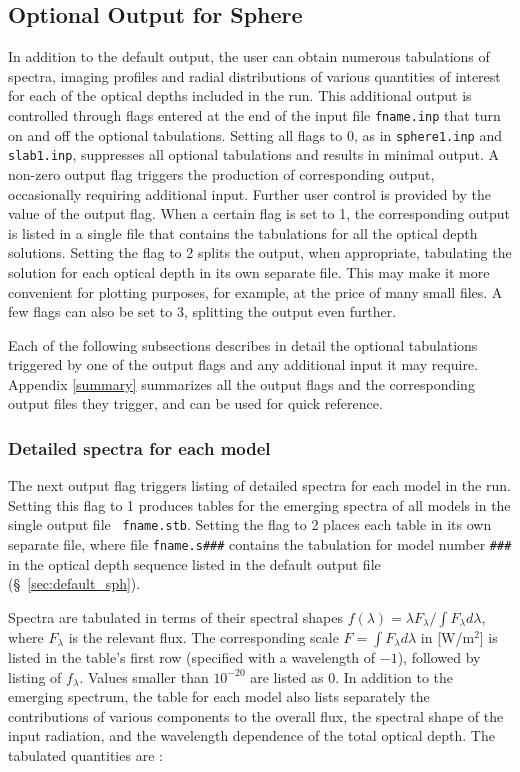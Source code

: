 \documentclass[11pt]{article}
\def\E#1{\hbox{$10^{#1}$}}
\begin{document}
\subsection{Optional Output for Sphere}
\label{sec:optional_sph}

In addition to the default output, the user can obtain numerous
tabulations of spectra, imaging profiles and radial distributions of
various quantities of interest for each of the optical depths included
in the run. This additional output is controlled through flags entered
at the end of the input file {\tt fname.inp} that turn on and off the
optional tabulations.  Setting all flags to 0, as in {\tt sphere1.inp}
and {\tt slab1.inp}, suppresses all optional tabulations and results
in minimal output. A non-zero output flag triggers the production of
corresponding output, occasionally requiring additional input.
Further user control is provided by the value of the output flag. When
a certain flag is set to 1, the corresponding output is listed in a
single file that contains the tabulations for all the optical depth
solutions. Setting the flag to 2 splits the output, when appropriate,
tabulating the solution for each optical depth in its own separate
file. This may make it more convenient for plotting purposes, for
example, at the price of many small files.  A few flags can also be
set to 3, splitting the output even further.

Each of the following subsections describes in detail the optional
tabulations triggered by one of the output flags and any additional
input it may require.  Appendix \ref{summary} summarizes all the
output flags and the corresponding output files they trigger, and can
be used for quick reference.


\subsubsection {Detailed spectra for each model}
\label{sec:detail_sph}

The next output flag triggers listing of detailed spectra for each
model in the run.  Setting this flag to 1 produces tables for the
emerging spectra of all models in the single output file {\tt
  fname.stb}.  Setting the flag to 2 places each table in its own
separate file, where file {\tt fname.s\#\#\#} contains the tabulation
for model number {\tt \#\#\#} in the optical depth sequence listed in
the default output file (\S~\ref{sec:default_sph}).

Spectra are tabulated in terms of their spectral shapes $f(\lambda) =
\lambda F_\lambda/\int\!F_\lambda d\lambda$, where $F_\lambda$ is the
relevant flux.  The corresponding scale $F = \int\!F_\lambda d\lambda$
in [W/m$^2$] is listed in the table's first row (specified with a
wavelength of $-1$), followed by listing of $f_\lambda$. Values
smaller than \E{-20} are listed as 0. In addition to the emerging
spectrum, the table for each model also lists separately the
contributions of various components to the overall flux, the spectral
shape of the input radiation, and the wavelength dependence of the
total optical depth. The tabulated quantities are :
\end{document}
